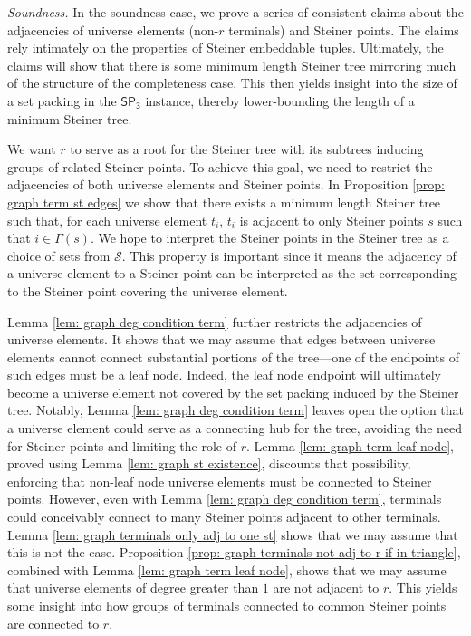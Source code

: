 \documentclass{theoretics}
\newcommand{\1}{\textbf{1}}
\newcommand{\setpT}{$\mathsf{SP_3}$\xspace}
\begin{document}
 

 \begin{paragraph}{\textit{Soundness.}}
 In the soundness case, we prove a series of consistent claims about the adjacencies of universe elements (non-$r$ terminals) and Steiner points. The claims rely intimately on the properties of Steiner embeddable tuples. Ultimately, the claims will show that there is some minimum length Steiner tree mirroring much of the structure of the completeness case. This then yields insight into the size of a set packing in the \setpT instance, thereby lower-bounding the length of a minimum Steiner tree.


We want $r$ to serve as a root for the Steiner tree with its subtrees inducing groups of related Steiner points. To achieve this goal, we need to restrict the adjacencies of both universe elements and Steiner points. In Proposition \ref{prop: graph term st edges} we show that there exists a minimum length Steiner tree such that, for each universe element $t_i$, $t_i$ is adjacent to only Steiner points $s$ such that $i \in \Gamma(s)$. We hope to interpret the Steiner points in the Steiner tree as a choice of sets from $\mathcal{S}$. This property is important since it means the adjacency of a universe element to a Steiner point can be interpreted as the set corresponding to the Steiner point covering the universe element.


Lemma \ref{lem: graph deg condition term} further restricts the adjacencies of universe elements. It shows that we may assume that edges between universe elements cannot connect substantial portions of the tree—one of the endpoints of such edges must be a leaf node. Indeed, the leaf node endpoint will ultimately become a universe element not covered by the set packing induced by the Steiner tree. Notably, Lemma \ref{lem: graph deg condition term} leaves open the option that a universe element could serve as a connecting hub for the tree, avoiding the need for Steiner points and limiting the role of $r$. Lemma \ref{lem: graph term leaf node}, proved using Lemma \ref{lem: graph st existence}, discounts that possibility, enforcing that non-leaf node universe elements must be connected to Steiner points.  However, even with Lemma \ref{lem: graph deg condition term}, terminals could conceivably connect to many Steiner points adjacent to other terminals. Lemma \ref{lem: graph terminals only adj to one st} shows that we may assume that this is not the case. Proposition \ref{prop: graph terminals not adj to r if in triangle}, combined with Lemma \ref{lem: graph term leaf node}, shows that we may assume that universe elements of degree greater than $1$ are not adjacent to $r$. This yields some insight into how groups of terminals connected to common Steiner points are connected to $r$.


\end{paragraph}
\end{document}
